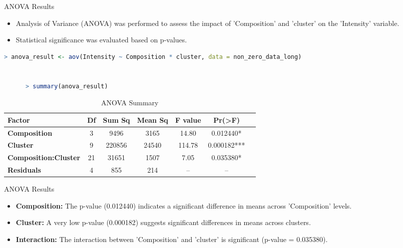\documentclass[aspectratio=169]{beamer}
\begin{document}
\begin{frame}[fragile]{ANOVA Results}
    \begin{itemize}
        \item Analysis of Variance (ANOVA) was performed to assess the impact of 'Composition' and 'cluster' on the 'Intensity' variable.
        \item Statistical significance was evaluated based on p-values.
    \end{itemize}

    \begin{lstlisting}[language=R, basicstyle=\tiny\ttfamily]
      > anova_result <- aov(Intensity ~ Composition * cluster, data = non_zero_data_long)


      > summary(anova_result)

\end{lstlisting}

\begin{table}[h]
\centering
\begin{tabular}{lcccccc}
\hline
\textbf{Factor} & \textbf{Df} & \textbf{Sum Sq} & \textbf{Mean Sq} & \textbf{F value} & \textbf{Pr(>F)} \\
\hline
\textbf{Composition} & 3 & 9496 & 3165 & 14.80 & 0.012440* \\
\textbf{Cluster} & 9 & 220856 & 24540 & 114.78 & 0.000182*** \\
\textbf{Composition:Cluster} & 21 & 31651 & 1507 & 7.05 & 0.035380* \\
\textbf{Residuals} & 4 & 855 & 214 & -- & -- \\
\hline
\end{tabular}
\caption{ANOVA Summary}
\label{tab:anova_summary}
\end{table}
\end{frame}

\begin{frame}[fragile]{ANOVA Results}
    \begin{itemize}
        \item \textbf{Composition:} The p-value (0.012440) indicates a significant difference in means across 'Composition' levels.
        \item \textbf{Cluster:} A very low p-value (0.000182) suggests significant differences in means across clusters.
        \item \textbf{Interaction:} The interaction between 'Composition' and 'cluster' is significant (p-value = 0.035380).
    \end{itemize}
\end{frame}
\end{document}
